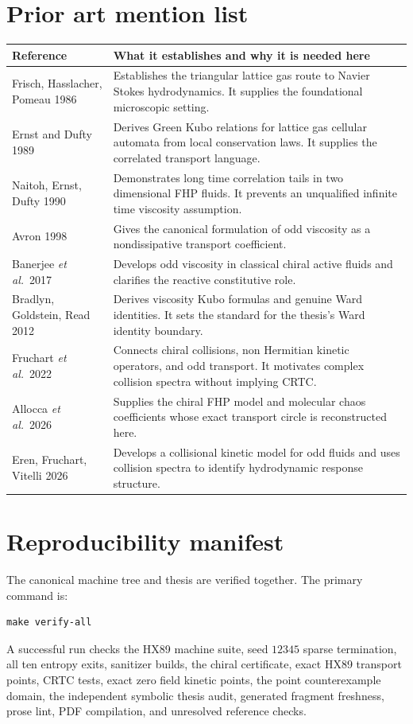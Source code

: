 \documentclass[11pt,a4paper]{article}
\newcommand{\etal}{\textit{et al.}}
\begin{document}
\section*{Prior art mention list}
\begin{longtable}{p{}p{}}
\toprule
Reference & What it establishes and why it is needed here \\
\midrule
\endhead
Frisch, Hasslacher, Pomeau 1986 \cite{FHP1986} & Establishes the triangular lattice gas route to Navier Stokes hydrodynamics. It supplies the foundational microscopic setting.\\
Ernst and Dufty 1989 \cite{ErnstDufty1989} & Derives Green Kubo relations for lattice gas cellular automata from local conservation laws. It supplies the correlated transport language.\\
Naitoh, Ernst, Dufty 1990 \cite{Naitoh1990} & Demonstrates long time correlation tails in two dimensional FHP fluids. It prevents an unqualified infinite time viscosity assumption.\\
Avron 1998 \cite{Avron1998} & Gives the canonical formulation of odd viscosity as a nondissipative transport coefficient.\\
Banerjee \etal\ 2017 \cite{Banerjee2017} & Develops odd viscosity in classical chiral active fluids and clarifies the reactive constitutive role.\\
Bradlyn, Goldstein, Read 2012 \cite{Bradlyn2012} & Derives viscosity Kubo formulas and genuine Ward identities. It sets the standard for the thesis's Ward identity boundary.\\
Fruchart \etal\ 2022 \cite{Fruchart2022} & Connects chiral collisions, non Hermitian kinetic operators, and odd transport. It motivates complex collision spectra without implying CRTC.\\
Allocca \etal\ 2026 \cite{Allocca2026} & Supplies the chiral FHP model and molecular chaos coefficients whose exact transport circle is reconstructed here.\\
Eren, Fruchart, Vitelli 2026 \cite{Eren2026} & Develops a collisional kinetic model for odd fluids and uses collision spectra to identify hydrodynamic response structure.\\
\bottomrule
\end{longtable}

\section*{Reproducibility manifest}
The canonical machine tree and thesis are verified together. The primary command is:
\begin{lstlisting}
make verify-all
\end{lstlisting}
A successful run checks the HX89 machine suite, seed $12345$ sparse termination, all ten entropy exits, sanitizer builds, the chiral certificate, \HXTransportGridPoints{} exact HX89 transport points, \CRTCUnitTests{} CRTC tests, \CRTCBoltzmannGridPoints{} exact zero field kinetic points, the \CRTCCounterGridPoints{} point counterexample domain, the independent symbolic thesis audit, generated fragment freshness, prose lint, PDF compilation, and unresolved reference checks.
\end{document}

